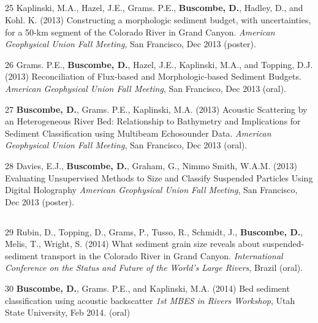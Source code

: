 \documentclass[margin,line]{resume}
\begin{document}
\begin{resume}
\begin{footnotesize}
	\subsection{}
	\begin{list1}
	\item[25] Kaplinski, M.A., Hazel, J.E., Grams. P.E., {\bf Buscombe, D.}, Hadley, D., and Kohl. K. (2013) Constructing a morphologic sediment budget, with uncertainties, for a 50-km segment of the Colorado River in Grand Canyon.  {\sl American Geophysical Union Fall Meeting}, San Francisco, Dec 2013 (poster).\\

	\item[26] Grams. P.E., {\bf Buscombe, D.}, Hazel, J.E., Kaplinski, M.A., and Topping, D.J. (2013) Reconciliation of Flux-based and Morphologic-based Sediment Budgets. {\sl American Geophysical Union Fall Meeting}, San Francisco, Dec 2013 (oral). \\

	\item[27] {\bf Buscombe, D.}, Grams. P.E., Kaplinski, M.A. (2013) Acoustic Scattering by an Heterogeneous River Bed: Relationship to Bathymetry and Implications for Sediment Classification using Multibeam Echosounder Data. {\sl American Geophysical Union Fall Meeting}, San Francisco, Dec 2013 (oral). \\

	\item[28] Davies, E.J., {\bf Buscombe, D.}, Graham, G., Nimmo Smith, W.A.M. (2013) Evaluating Unsupervised Methods to Size and Classify Suspended Particles Using Digital Holography {\sl American Geophysical Union Fall Meeting}, San Francisco, Dec 2013 (poster). 
	\end{list1}

	\subsection{}
	\begin{list1}
        \item[29] Rubin, D., Topping, D., Grams, P., Tusso, R., Schmidt, J., {\bf Buscombe, D.}, Melis, T., Wright, S. (2014) What sediment grain size reveals about suspended-sediment transport in the Colorado River in Grand Canyon. {\sl International Conference on the Status and Future of the World's Large Rivers}, Brazil (oral).\\

        \item[30] {\bf Buscombe, D.}, Grams. P.E., and Kaplinski, M.A. (2014) Bed sediment classification using acoustic backscatter {\sl 1st MBES in Rivers Workshop}, Utah State University, Feb 2014. (oral)\\


\end{list1}
\end{footnotesize}
\end{resume}
\end{document}
